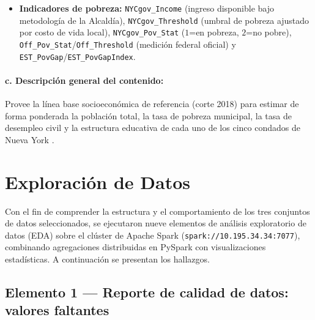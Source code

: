 \documentclass[11pt,a4paper]{article}
\begin{document}
\begin{itemize}
    \item \textbf{Indicadores de pobreza:} \texttt{NYCgov\_Income} (ingreso disponible bajo metodología de la Alcaldía), \texttt{NYCgov\_Threshold} (umbral de pobreza ajustado por costo de vida local), \texttt{NYCgov\_Pov\_Stat} ($1$=en pobreza, $2$=no pobre), \texttt{Off\_Pov\_Stat}/\texttt{Off\_Threshold} (medición federal oficial) y \texttt{EST\_PovGap}/\texttt{EST\_PovGapIndex}.
\end{itemize}

\paragraph{c. Descripción general del contenido:} Provee la línea base socioeconómica de referencia (corte 2018) para estimar de forma ponderada la población total, la tasa de pobreza municipal, la tasa de desempleo civil y la estructura educativa de cada uno de los cinco condados de Nueva York \cite{nyc_poverty_data_2018}.



\section{Exploración de Datos}
\label{sec:exploracion_datos}

Con el fin de comprender la estructura y el comportamiento de los tres conjuntos de datos seleccionados, se ejecutaron nueve elementos de análisis exploratorio de datos (EDA) sobre el clúster de Apache Spark (\texttt{spark://10.195.34.34:7077}), combinando agregaciones distribuidas en PySpark con visualizaciones estadísticas. A continuación se presentan los hallazgos.

\subsection{Elemento 1 --- Reporte de calidad de datos: valores faltantes}
\label{subsec:eda_elemento1}
\end{document}
